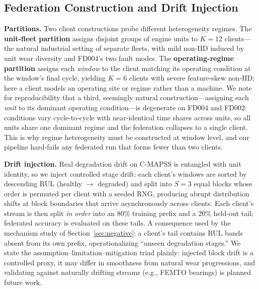 \documentclass[journal]{IEEEtran}
\begin{document}
\subsection{Federation Construction and Drift Injection}\label{sec:federation}
\textbf{Partitions.} Two client constructions probe different heterogeneity regimes. The \textbf{unit-fleet partition} assigns disjoint groups of engine units to $K = 12$ clients---the natural industrial setting of separate fleets, with mild non-IID induced by unit wear diversity and FD004's two fault modes. The \textbf{operating-regime partition} assigns each \emph{window} to the client matching its operating condition at the window's final cycle, yielding $K = 6$ clients with severe feature-skew non-IID; here a client models an operating site or regime rather than a machine. We note for reproducibility that a third, seemingly natural construction---assigning each \emph{unit} to its dominant operating condition---is degenerate on FD004 and FD002: conditions vary cycle-to-cycle with near-identical time shares across units, so all units share one dominant regime and the federation collapses to a single client. This is why regime heterogeneity must be constructed at window level, and our pipeline hard-fails any federated run that forms fewer than two clients.

\textbf{Drift injection.} Real degradation drift on C-MAPSS is entangled with unit identity, so we inject controlled stage drift: each client's windows are sorted by descending RUL (healthy $\rightarrow$ degraded) and split into $S = 3$ equal blocks whose order is permuted per client with a seeded RNG, producing abrupt distribution shifts at block boundaries that arrive asynchronously across clients. Each client's stream is then split \emph{in order} into an 80\% training prefix and a 20\% held-out tail; federated accuracy is evaluated on these tails. A consequence used by the mechanism study of Section~\ref{sec:negative}: a client's tail contains RUL bands absent from its own prefix, operationalizing ``unseen degradation stages.'' We state the assumption--limitation--mitigation triad plainly: injected block drift is a controlled proxy, it may differ in smoothness from natural wear progressions, and validating against naturally drifting streams (e.g., FEMTO bearings) is planned future work.
\end{document}
